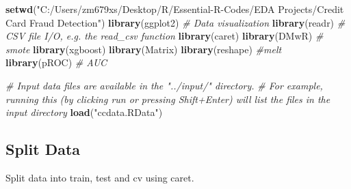\documentclass[11pt,]{article}
\newenvironment{Shaded}{\begin{snugshade}}{\end{snugshade}}
\newcommand{\KeywordTok}[1]{\textcolor[rgb]{0.13,0.29,0.53}{\textbf{#1}}}
\newcommand{\DataTypeTok}[1]{\textcolor[rgb]{0.13,0.29,0.53}{#1}}
\newcommand{\DecValTok}[1]{\textcolor[rgb]{0.00,0.00,0.81}{#1}}
\newcommand{\StringTok}[1]{\textcolor[rgb]{0.31,0.60,0.02}{#1}}
\newcommand{\CommentTok}[1]{\textcolor[rgb]{0.56,0.35,0.01}{\textit{#1}}}
\newcommand{\OperatorTok}[1]{\textcolor[rgb]{0.81,0.36,0.00}{\textbf{#1}}}
\newcommand{\NormalTok}[1]{#1}
\begin{document}
\begin{Shaded}
\begin{Highlighting}[]
\KeywordTok{setwd}\NormalTok{(}\StringTok{"C:/Users/zm679xs/Desktop/R/Essential-R-Codes/EDA Projects/Credit Card Fraud Detection"}\NormalTok{)}
\KeywordTok{library}\NormalTok{(ggplot2) }\CommentTok{# Data visualization}
\KeywordTok{library}\NormalTok{(readr) }\CommentTok{# CSV file I/O, e.g. the read_csv function}
\KeywordTok{library}\NormalTok{(caret)}
\KeywordTok{library}\NormalTok{(DMwR) }\CommentTok{# smote}
\KeywordTok{library}\NormalTok{(xgboost)}
\KeywordTok{library}\NormalTok{(Matrix)}
\KeywordTok{library}\NormalTok{(reshape) }\CommentTok{#melt}
\KeywordTok{library}\NormalTok{(pROC) }\CommentTok{# AUC}

\CommentTok{# Input data files are available in the "../input/" directory.}
\CommentTok{# For example, running this (by clicking run or pressing Shift+Enter) will list the files in the input directory}
\KeywordTok{load}\NormalTok{(}\StringTok{"ccdata.RData"}\NormalTok{)}
\end{Highlighting}
\end{Shaded}

\subsection{Split Data}\label{split-data}

Split data into train, test and cv using caret.

\begin{Shaded}
\end{Shaded}
\end{document}
